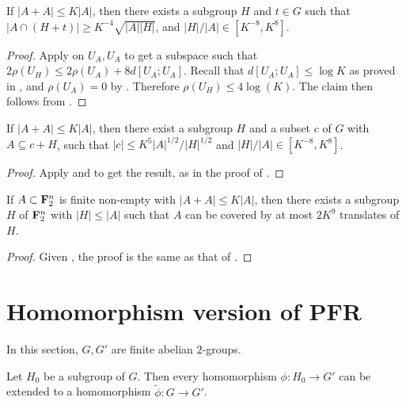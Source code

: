\begin{corollary}\label{pfr-9-aux}\leanok
If $|A+A| \leq K|A|$, then there exists a subgroup $H$ and $t\in G$ such that
$|A \cap (H+t)| \geq K^{-4} \sqrt{|A||H|}$, and $|H|/|A|\in[K^{-8},K^8]$.
\end{corollary}

\begin{proof}\leanok
  Apply  on $U_A,U_A$ to get a subspace such that $2\rho(U_H)\le 2\rho(U_A)+8d[U_A;U_A]$. Recall that $d[U_A;U_A]\le \log K$ as proved in , and $\rho(U_A)=0$ by . Therefore $\rho(U_H)\le 4\log(K)$. The claim then follows from .
\end{proof}


\begin{corollary}\label{pfr-9-aux'}\leanok
If $|A+A| \leq K|A|$, then there exist a subgroup $H$ and a subset $c$ of $G$
with $A \subseteq c + H$, such that $|c| \leq K^{5} |A|^{1/2}/|H|^{1/2}$ and
$|H|/|A|\in[K^{-8},K^8]$.
\end{corollary}

\begin{proof}\leanok
Apply  and  to get the result, as in the proof
of .
\end{proof}


\begin{theorem}[PFR with \texorpdfstring{$C=9$}{C=9}]\label{pfr-9}\leanok  If $A \subset {\bf F}_2^n$ is finite non-empty with $|A+A| \leq K|A|$, then there exists a subgroup $H$ of ${\bf F}_2^n$ with $|H| \leq |A|$ such that $A$ can be covered by at most $2K^9$ translates of $H$.
\end{theorem}

\begin{proof}\leanok
Given , the proof is the same as that of .
\end{proof}


\chapter{Homomorphism version of PFR}

In this section, $G, G'$ are finite abelian $2$-groups.

\begin{lemma}\label{hb-thm}\leanok  Let $H_0$ be a subgroup of $G$.  Then every homomorphism $\phi: H_0 \to G'$ can be extended to a homomorphism $\tilde \phi: G \to G'$.
\end{lemma}

